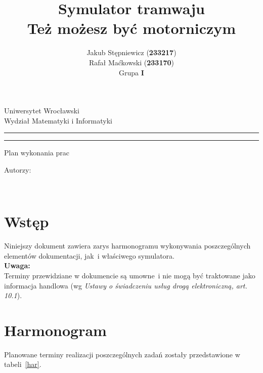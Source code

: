 \documentclass[12pt,a4paper]{article}
\author{Jakub Stępniewicz (\textbf{233217})\\Rafał Maćkowski (\textbf{233170})\\Grupa {\bf I}}
\title{Symulator tramwaju\\ \small{Też możesz być motorniczym}}
\makeatletter
\newcommand{\linia}{\rule{\linewidth}{0.4mm}}
\renewcommand{\maketitle}{\begin{titlepage}
		\vspace*{1cm}
    \begin{center}\small
    	Uniwersytet Wrocławski\\
    	Wydział Matematyki i Informatyki\\
    \end{center}
    \vspace{3cm}
    \noindent
    \linia
    \begin{center}
    	\LARGE{\textsc{\@title}}
         \end{center}
     \linia
    \begin{center}
    	\Large{Plan wykonania prac}
         \end{center}
    \vspace{0.5cm}

    \begin{flushright}

    \begin{minipage}{5.5cm}

    	\small Autorzy:

    \normalsize {\@author} \par
    

    \end{minipage}
    \vspace{5cm}

     

     \end{flushright}

    \vspace*{\stretch{6}}

    \begin{center}

    \@date\\

    \end{center}

  \end{titlepage}%

}
\makeatother
\begin{document}
\maketitle
\tableofcontents
\vspace{5cm}
\newpage
% 

\section{Wstęp}
Niniejszy dokument zawiera zarys harmonogramu wykonywania poszczególnych elementów dokumentacji, jak~i właściwego symulatora. \\ {\bf
	Uwaga:}\\
	Terminy przewidziane w dokumencie są umowne~i nie mogą być traktowane jako informacja handlowa 
	(wg {\it Ustawy o świadczeniu usług drogą elektroniczną, art. 10.1}).

\section{Harmonogram}
Planowane terminy realizacji poszczególnych zadań zostały przedstawione w tabeli~\ref{har}.
\end{document}
